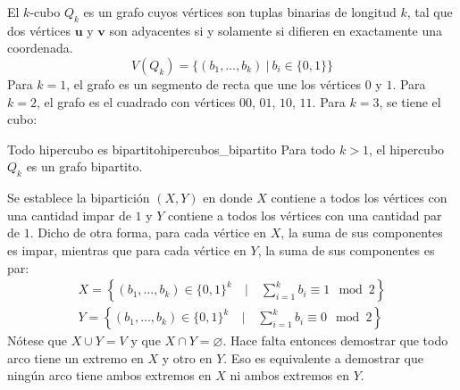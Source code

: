 El \(k\)-cubo \(Q_k\) es un grafo cuyos vértices son tuplas binarias de longitud \(k\), tal que dos vértices \(\mathbf{u}\) y \(\mathbf{v}\) son adyacentes si y solamente si difieren en exactamente una coordenada. \[
V (Q_k) = \{(b_1,\ldots,b_k) \ | \ b_i \in \{0,1\}\}
\] Para \(k = 1\), el grafo es un segmento de recta que une los vértices \(0\) y \(1\). Para \(k=2\), el grafo es el cuadrado con vértices \(00\), \(01\), \(10\), \(11\). Para \(k=3\), se tiene el cubo:
\begin{center}
  \label{fig:hipercubo_q3}
\end{center}

\begin{teorema}{Todo hipercubo es bipartito}{hipercubos_bipartito}
  Para todo \(k>1\), el hipercubo \(Q_k\) es un grafo bipartito.
\end{teorema}

Se establece la bipartición \((X,Y)\) en donde \(X\) contiene a todos los vértices con una cantidad impar de \(1\) y \(Y\) contiene a todos los vértices con una cantidad par de \(1\). Dicho de otra forma, para cada vértice en \(X\), la suma de sus componentes es impar, mientras que para cada vértice en \(Y\), la suma de sus componentes es par:\begin{gather*}
X = \left\{(b_1,\ldots,b_k) \in \{0,1\}^k \quad \Big| \quad \sum_{i=1}^kb_i \equiv 1\mod 2\right\} \\
Y = \left\{(b_1,\ldots,b_k) \in \{0,1\}^k \quad \Big| \quad \sum_{i=1}^kb_i \equiv 0\mod 2\right\}
\end{gather*}Nótese que \(X \cup Y = V\) y que \(X \cap Y = \varnothing\). Hace falta entonces demostrar que todo arco tiene un extremo en \(X\) y otro en \(Y\). Eso es equivalente a demostrar que ningún arco tiene ambos extremos en \(X\) ni ambos extremos en \(Y\).

